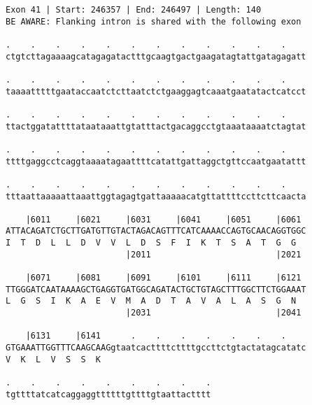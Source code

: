 \documentclass{article}
\begin{document}
\newpage
\begin{Verbatim}
Exon 41 | Start: 246357 | End: 246497 | Length: 140
BE AWARE: Flanking intron is shared with the following exon
 
.    .    .    .    .    .    .    .    .    .    .    .    
ctgtcttagaaaagcatagagatactttgcaagtgactgaagatagtattgatagagatt
  
.    .    .    .    .    .    .    .    .    .    .    .    
taaaatttttgaataccaatctcttaatctctgaaggagtcaaatgaatatactcatcct
  
.    .    .    .    .    .    .    .    .    .    .    .    
ttactggatattttataataaattgtatttactgacaggcctgtaaataaaatctagtat
  
.    .    .    .    .    .    .    .    .    .    .    .    
ttttgaggcctcaggtaaaatagaattttcatattgattaggctgttccaatgaatattt
  
.    .    .    .    .    .    .    .    .    .    .    .    
tttaattaaaaattaaattggtagagtgattaaaaacatgttattttccttcttcaacta
  
    |6011     |6021     |6031     |6041     |6051     |6061 
ATTACAGATCTGCTTGATGTTGTACTAGACAGTTTCATCAAAACCAGTGCAACAGGTGGC
I  T  D  L  L  D  V  V  L  D  S  F  I  K  T  S  A  T  G  G  
                        |2011                         |2021 
  
    |6071     |6081     |6091     |6101     |6111     |6121 
TTGGGATCAATAAAAGCTGAGGTGATGGCAGATACTGCTGTAGCTTTGGCTTCTGGAAAT
L  G  S  I  K  A  E  V  M  A  D  T  A  V  A  L  A  S  G  N  
                        |2031                         |2041 
  
    |6131     |6141      .    .    .    .    .    .    .    
GTGAAATTGGTTTCAAGCAAGgtaatcacttttcttttgccttctgtactatagcatatc
V  K  L  V  S  S  K                                         
  
.    .    .    .    .    .    .    .    .
tgttttatcatcaggaggttttttgttttgtaattactttt
\end{Verbatim}
\newpage
\end{document}

